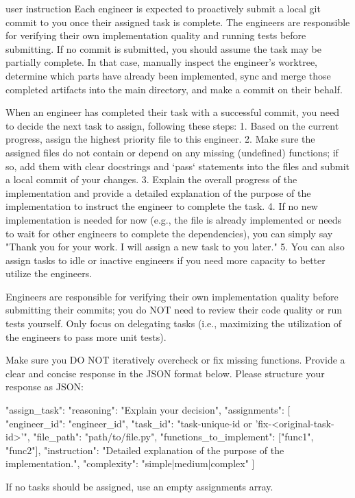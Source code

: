 \begin{promptbox}{user instruction}
Each engineer is expected to proactively submit a local git commit to you once their
assigned task is complete. The engineers are responsible for verifying their own
implementation quality and running tests before submitting. If no commit is submitted,
you should assume the task may be partially complete. In that case, manually inspect
the engineer's worktree, determine which parts have already been implemented, sync
and merge those completed artifacts into the main directory, and make a commit on
their behalf.

When an engineer has completed their task with a successful commit, you need to
decide the next task to assign, following these steps:
  1. Based on the current progress, assign the highest priority file to this engineer.
  2. Make sure the assigned files do not contain or depend on any missing (undefined) functions; if so, add them with clear docstrings and `pass` statements into the files and submit a local commit of your changes.
  3. Explain the overall progress of the implementation and provide a detailed explanation of the purpose of the implementation to instruct the engineer
     to complete the task.
  4. If no new implementation is needed for now (e.g., the file is already implemented or needs to wait for other engineers to complete the dependencies), you can simply say "Thank you for your work. I will assign a new task to you later."
  5. You can also assign tasks to idle or inactive engineers if you need more capacity to better utilize the engineers.

Engineers are responsible for verifying their own implementation quality before
submitting their commits; you do NOT need to review their code quality or run tests
yourself. Only focus on delegating tasks (i.e., maximizing the utilization of the
engineers to pass more unit tests).

Make sure you DO NOT iteratively overcheck or fix missing functions.
Provide a clear and concise response in the JSON format below.
Please structure your response as JSON:

{
  "assign_task": {
    "reasoning": "Explain your decision",
    "assignments": [
      {
        "engineer_id": "engineer_id",
        "task_id": "task-unique-id or 'fix-<original-task-id>'",
        "file_path": "path/to/file.py",
        "functions_to_implement": ["func1", "func2"],
        "instruction": "Detailed explanation of the purpose of the implementation.",
        "complexity": "simple|medium|complex"
      }
    ]
  }
}

If no tasks should be assigned, use an empty assignments array.
\end{promptbox}

